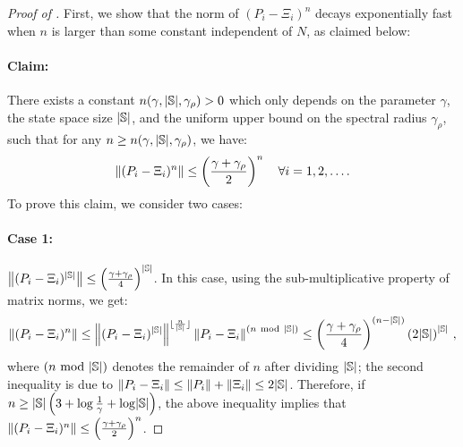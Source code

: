 \begin{proof}[Proof of ]
First, we show that the norm of $(P_i-\Xi_i)^n$ decays exponentially fast when $n$ is larger than some constant independent of $N$, as claimed below: 
\paragraph{Claim:} There exists a constant $n(\gamma,\lvert\mathbb{S}\rvert,\gamma_{\rho})>0$ which only depends on the parameter $\gamma$, the state space size $\lvert\mathbb{S}\rvert$, and the uniform upper bound on the spectral radius $\gamma_{\rho}$, such that for any $n \geq n(\gamma,\lvert\mathbb{S}\rvert,\gamma_{\rho})$, we have:
    \begin{align*}
        \left\lVert(P_i-\Xi_i)^n\right\rVert\leq \left(\frac{\gamma+\gamma_{\rho}}{2}\right)^n \quad \forall i=1,2,\dots.
    \end{align*}
    To prove this claim, we consider two cases: 
    \paragraph{Case 1:} $\left\lVert(P_i-\Xi_i)^{\lvert\mathbb{S}\rvert}\right\rVert\leq \left(\frac{\gamma+\gamma_{\rho}}{4}\right)^{\lvert\mathbb{S}\rvert}$. In this case, using the sub-multiplicative property of matrix norms, we get:
    \begin{align*}
        \left\lVert(P_i-\Xi_i)^n\right\rVert\leq \left\lVert(P_i-\Xi_i)^{\lvert\mathbb{S}\rvert}\right\rVert^{\lfloor \frac{n}{\lvert\mathbb{S}\rvert} \rfloor} \left\lVert P_i-\Xi_i\right\rVert^{(n ~\text{mod}~ \lvert\mathbb{S}\rvert)}\leq \left(\frac{\gamma+\gamma_{\rho}}{4}\right)^{(n-\lvert\mathbb{S}\rvert)}\left(2\lvert\mathbb{S}\rvert\right)^{\lvert\mathbb{S}\rvert}\,,
    \end{align*}
    where $(n ~\text{mod}~ \lvert\mathbb{S}\rvert)$ denotes the remainder of $n$ after dividing $\lvert\mathbb{S}\rvert$; the second inequality is due to $\left\lVert P_i-\Xi_i\right\rVert\leq \left\lVert P_i\right\rVert + \left\lVert\Xi_i\right\rVert\leq 2{\lvert\mathbb{S}\rvert}$. 
    Therefore, if $n\geq \lvert\mathbb{S}\rvert\left(3+\log \frac{1}{\gamma}+\log\lvert\mathbb{S}\rvert\right) $, the above inequality implies that $\left\lVert(P_i-\Xi_i)^n\right\rVert \leq \left(\frac{\gamma+\gamma_{\rho}}{2}\right)^n$. 

\end{proof}
